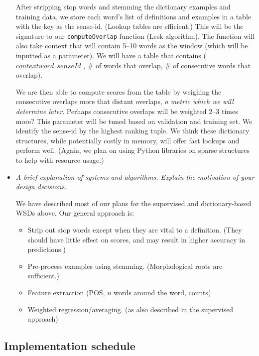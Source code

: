 \documentclass{article}
\begin{document}
\begin{itemize}
After stripping stop words and stemming the dictionary examples and training data, we store each word's list of definitions and examples in a table with the key as the sense-id. (Lookup tables are efficient.) This will be the signature to our \texttt{computeOverlap} function (Lesk algorithm). The function will also take context that will contain 5--10 words as the window (which will be inputted as a parameter). We will have a table that contains (\(contextword, senseId\) , \# of words that overlap, \# of consecutive words that overlap).\par
We are then able to compute scores from the table by weighing the consecutive overlaps more that distant overlaps, \textit{a metric which we will determine later}. Perhaps consecutive overlaps will be weighted 2--3 times more? This parameter will be tuned based on validation and training set. We identify the sense-id by the highest ranking tuple. We think these dictionary structures, while potentially costly in memory, will offer fast lookups and perform well. (Again, we plan on using Python libraries on sparse structures to help with resource usage.)

\item \textit{A brief explanation of systems and algorithms. Explain the motivation of your design decisions.}\par
We have described most of our plans for the supervised and dictionary-based WSDs above. Our general approach is:
\begin{itemize}[noitemsep,nolistsep]
\item Strip out stop words except when they are vital to a definition. (They should have little effect on scores, and may result in higher accuracy in predictions.)
\item Pre-process examples using stemming. (Morphological roots are sufficient.)
\item Feature extraction (POS, $n$ words around the word, counts)
\item Weighted regression/averaging. (as also described in the supervised approach)
\end{itemize}

\end{itemize}

\subsection*{Implementation schedule}
\end{document}
